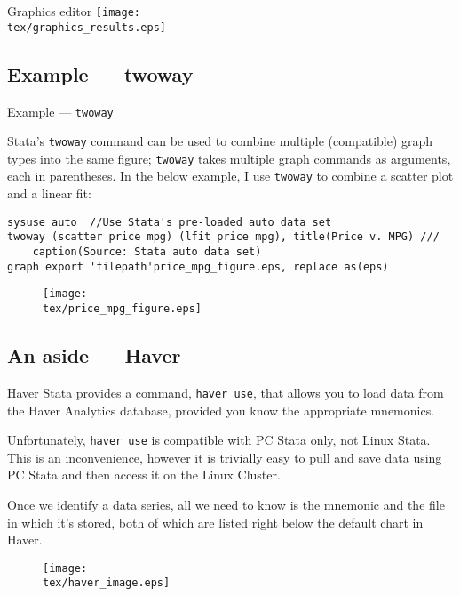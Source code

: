 \documentclass[fleqn, handout, 10pt]{beamer}
\def\tex{S:/trainings/stata/tex}
\def\lst{\lstinline}
\begin{document}
\begin{frame}{Graphics editor}
    \texttt{[image: \\tex/graphics\_results.eps]}
\end{frame}


\subsection{Example --- twoway}

\begin{frame}[fragile]{Example --- \lst=twoway=}

 Stata's \lst=twoway= command can be used to combine multiple (compatible) graph types into the same figure; \lst=twoway= takes multiple graph commands as arguments, each in parentheses. In the below example, I use \lst=twoway= to combine a scatter plot and a linear fit:

    \begin{lstlisting}
sysuse auto  //Use Stata's pre-loaded auto data set
twoway (scatter price mpg) (lfit price mpg), title(Price v. MPG) ///
	caption(Source: Stata auto data set)
graph export 'filepath'price_mpg_figure.eps, replace as(eps)
    \end{lstlisting}
	\pause
    \begin{figure}
	\texttt{[image: \\tex/price\_mpg\_figure.eps]}
    \end{figure}
\end{frame}

\subsection{An aside --- Haver}

\begin{frame}{Haver}
    Stata provides a command, \lst=haver use=, that allows you to load data from the Haver Analytics database, provided you know the appropriate mnemonics.

    Unfortunately, \lst=haver use= is compatible with PC Stata only, not Linux Stata. This is an inconvenience, however it is trivially easy to pull and save data using PC Stata and then access it on the Linux Cluster.

    Once we identify a data series, all we need to know is the mnemonic and the file in which it's stored, both of which are listed right below the default chart in Haver.

    \begin{figure}
	\texttt{[image: \\tex/haver\_image.eps]}
    \end{figure}
\end{frame}
\end{document}
